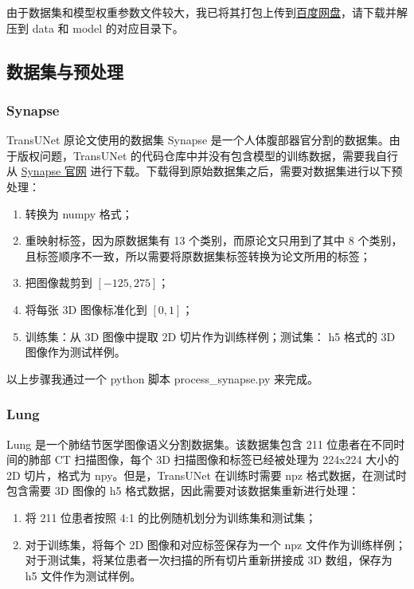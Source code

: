 \documentclass[hyperref,a4paper,UTF8]{ctexart}
\begin{document}
由于数据集和模型权重参数文件较大，我已将其打包上传到\href{https://pan.baidu.com/s/15jhB_8Fxr5q2AzKVAe5yJg?pwd=t2ee}{百度网盘}，请下载并解压到 data 和 model 的对应目录下。

\subsection{数据集与预处理}

\subsubsection{Synapse}

TransUNet 原论文使用的数据集 Synapse 是一个人体腹部器官分割的数据集。由于版权问题，TransUNet 的代码仓库中并没有包含模型的训练数据，需要我自行从 \href{https://www.synapse.org/#!Synapse:syn3193805/wiki/}{Synapse 官网} 进行下载。下载得到原始数据集之后，需要对数据集进行以下预处理：

\begin{enumerate}[itemsep=2pt,topsep=0pt,parsep=0pt]
    \item 转换为 numpy 格式；
    \item 重映射标签，因为原数据集有 13 个类别，而原论文只用到了其中 8 个类别，且标签顺序不一致，所以需要将原数据集标签转换为论文所用的标签；
    \item 把图像裁剪到 $[-125, 275]$；
    \item 将每张 3D 图像标准化到 $[0, 1]$；
    \item 训练集：从 3D 图像中提取 2D 切片作为训练样例；测试集： h5 格式的 3D 图像作为测试样例。
\end{enumerate}

以上步骤我通过一个 python 脚本 process\_synapse.py 来完成。

\subsubsection{Lung}

Lung 是一个肺结节医学图像语义分割数据集。该数据集包含 211 位患者在不同时间的肺部 CT 扫描图像，每个 3D 扫描图像和标签已经被处理为 224x224 大小的 2D 切片，格式为 npy。但是，TransUNet 在训练时需要 npz 格式数据，在测试时包含需要 3D 图像的 h5 格式数据，因此需要对该数据集重新进行处理：

\begin{enumerate}[itemsep=2pt,topsep=0pt,parsep=0pt]
    \item 将 211 位患者按照 4:1 的比例随机划分为训练集和测试集；
    \item 对于训练集，将每个 2D 图像和对应标签保存为一个 npz 文件作为训练样例；对于测试集，将某位患者一次扫描的所有切片重新拼接成 3D 数组，保存为 h5 文件作为测试样例。
\end{enumerate}
\end{document}
